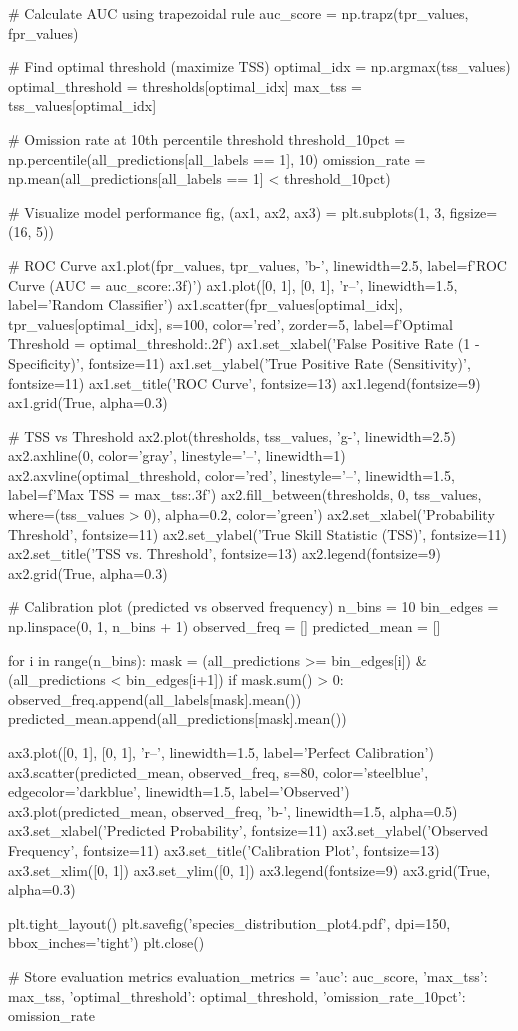 \documentclass[11pt,a4paper]{article}
\begin{document}
\begin{pycode}
# Calculate AUC using trapezoidal rule
auc_score = np.trapz(tpr_values, fpr_values)

# Find optimal threshold (maximize TSS)
optimal_idx = np.argmax(tss_values)
optimal_threshold = thresholds[optimal_idx]
max_tss = tss_values[optimal_idx]

# Omission rate at 10th percentile threshold
threshold_10pct = np.percentile(all_predictions[all_labels == 1], 10)
omission_rate = np.mean(all_predictions[all_labels == 1] < threshold_10pct)

# Visualize model performance
fig, (ax1, ax2, ax3) = plt.subplots(1, 3, figsize=(16, 5))

# ROC Curve
ax1.plot(fpr_values, tpr_values, 'b-', linewidth=2.5, label=f'ROC Curve (AUC = {auc_score:.3f})')
ax1.plot([0, 1], [0, 1], 'r--', linewidth=1.5, label='Random Classifier')
ax1.scatter(fpr_values[optimal_idx], tpr_values[optimal_idx], s=100,
           color='red', zorder=5, label=f'Optimal Threshold = {optimal_threshold:.2f}')
ax1.set_xlabel('False Positive Rate (1 - Specificity)', fontsize=11)
ax1.set_ylabel('True Positive Rate (Sensitivity)', fontsize=11)
ax1.set_title('ROC Curve', fontsize=13)
ax1.legend(fontsize=9)
ax1.grid(True, alpha=0.3)

# TSS vs Threshold
ax2.plot(thresholds, tss_values, 'g-', linewidth=2.5)
ax2.axhline(0, color='gray', linestyle='--', linewidth=1)
ax2.axvline(optimal_threshold, color='red', linestyle='--', linewidth=1.5,
           label=f'Max TSS = {max_tss:.3f}')
ax2.fill_between(thresholds, 0, tss_values, where=(tss_values > 0),
                alpha=0.2, color='green')
ax2.set_xlabel('Probability Threshold', fontsize=11)
ax2.set_ylabel('True Skill Statistic (TSS)', fontsize=11)
ax2.set_title('TSS vs. Threshold', fontsize=13)
ax2.legend(fontsize=9)
ax2.grid(True, alpha=0.3)

# Calibration plot (predicted vs observed frequency)
n_bins = 10
bin_edges = np.linspace(0, 1, n_bins + 1)
observed_freq = []
predicted_mean = []

for i in range(n_bins):
    mask = (all_predictions >= bin_edges[i]) & (all_predictions < bin_edges[i+1])
    if mask.sum() > 0:
        observed_freq.append(all_labels[mask].mean())
        predicted_mean.append(all_predictions[mask].mean())

ax3.plot([0, 1], [0, 1], 'r--', linewidth=1.5, label='Perfect Calibration')
ax3.scatter(predicted_mean, observed_freq, s=80, color='steelblue',
           edgecolor='darkblue', linewidth=1.5, label='Observed')
ax3.plot(predicted_mean, observed_freq, 'b-', linewidth=1.5, alpha=0.5)
ax3.set_xlabel('Predicted Probability', fontsize=11)
ax3.set_ylabel('Observed Frequency', fontsize=11)
ax3.set_title('Calibration Plot', fontsize=13)
ax3.set_xlim([0, 1])
ax3.set_ylim([0, 1])
ax3.legend(fontsize=9)
ax3.grid(True, alpha=0.3)

plt.tight_layout()
plt.savefig('species_distribution_plot4.pdf', dpi=150, bbox_inches='tight')
plt.close()

# Store evaluation metrics
evaluation_metrics = {
    'auc': auc_score,
    'max_tss': max_tss,
    'optimal_threshold': optimal_threshold,
    'omission_rate_10pct': omission_rate
}
\end{pycode}
\end{document}
